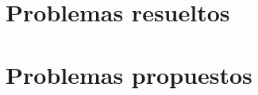 \section{Problemas resueltos}
{
    \begin{section-problem}
    \end{section-problem}
}

\section{Problemas propuestos}
{
    \begin{section-problem}
    \end{section-problem}
}